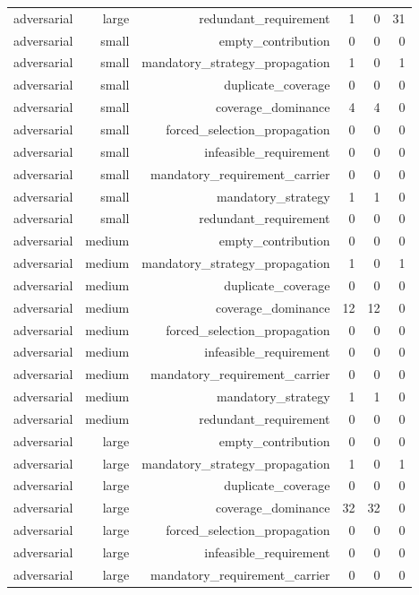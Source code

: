 {\begin{longtable}{lrrrrr}
adversarial & large & redundant\_requirement & 1 & 0 & 31 \\
adversarial & small & empty\_contribution & 0 & 0 & 0 \\
adversarial & small & mandatory\_strategy\_propagation & 1 & 0 & 1 \\
adversarial & small & duplicate\_coverage & 0 & 0 & 0 \\
adversarial & small & coverage\_dominance & 4 & 4 & 0 \\
adversarial & small & forced\_selection\_propagation & 0 & 0 & 0 \\
adversarial & small & infeasible\_requirement & 0 & 0 & 0 \\
adversarial & small & mandatory\_requirement\_carrier & 0 & 0 & 0 \\
adversarial & small & mandatory\_strategy & 1 & 1 & 0 \\
adversarial & small & redundant\_requirement & 0 & 0 & 0 \\
adversarial & medium & empty\_contribution & 0 & 0 & 0 \\
adversarial & medium & mandatory\_strategy\_propagation & 1 & 0 & 1 \\
adversarial & medium & duplicate\_coverage & 0 & 0 & 0 \\
adversarial & medium & coverage\_dominance & 12 & 12 & 0 \\
adversarial & medium & forced\_selection\_propagation & 0 & 0 & 0 \\
adversarial & medium & infeasible\_requirement & 0 & 0 & 0 \\
adversarial & medium & mandatory\_requirement\_carrier & 0 & 0 & 0 \\
adversarial & medium & mandatory\_strategy & 1 & 1 & 0 \\
adversarial & medium & redundant\_requirement & 0 & 0 & 0 \\
adversarial & large & empty\_contribution & 0 & 0 & 0 \\
adversarial & large & mandatory\_strategy\_propagation & 1 & 0 & 1 \\
adversarial & large & duplicate\_coverage & 0 & 0 & 0 \\
adversarial & large & coverage\_dominance & 32 & 32 & 0 \\
adversarial & large & forced\_selection\_propagation & 0 & 0 & 0 \\
adversarial & large & infeasible\_requirement & 0 & 0 & 0 \\
adversarial & large & mandatory\_requirement\_carrier & 0 & 0 & 0 \\

\end{longtable}}
